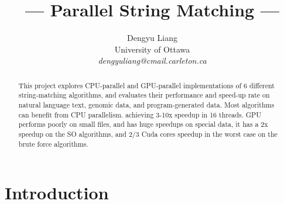 \documentclass[11pt]{article}       %
\begin{document}


\title{--- Parallel String Matching ---}


\author{
Dengyu Liang\\
University of Ottawa\\
{\em dengyuliang@cmail.carleton.ca}
} %

\maketitle

\begin{abstract}
This project explores CPU-parallel and GPU-parallel implementations of 6 different string-matching algorithms, and evaluates their performance and speed-up rate on natural language text, genomic data, and program-generated data. Most algorithms can benefit from CPU parallelism. achieving 3-10x speedup in 16 threads. GPU performs poorly on small files, and has huge speedups on special data, it has a 2x speedup on the SO algorithms, and 2/3 Cuda cores speedup in the worst case on the brute force algorithms.

\end{abstract}


\section{Introduction} \label{intro}
\end{document}
